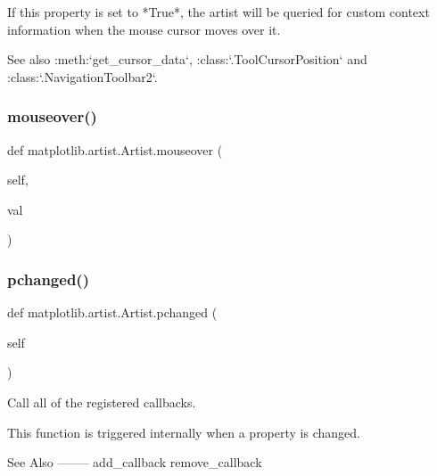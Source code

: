 \begin{DoxyVerb}If this property is set to *True*, the artist will be queried for
custom context information when the mouse cursor moves over it.

See also :meth:`get_cursor_data`, :class:`.ToolCursorPosition` and
:class:`.NavigationToolbar2`.
\end{DoxyVerb}
 \mbox{\label{classmatplotlib_1_1artist_1_1Artist_a72303987b50ca8e6dd2e15133882b6f6}} 
\subsubsection{\texorpdfstring{mouseover()}{mouseover()}\hspace{0.1cm}{\footnotesize\ttfamily [2/2]}}
{\footnotesize\ttfamily def matplotlib.\+artist.\+Artist.\+mouseover (\begin{DoxyParamCaption}\item[{}]{self,  }\item[{}]{val }\end{DoxyParamCaption})}

\mbox{\label{classmatplotlib_1_1artist_1_1Artist_a2a0afb32e4bb80f08e96099ccc92c00f}} 
\subsubsection{\texorpdfstring{pchanged()}{pchanged()}}
{\footnotesize\ttfamily def matplotlib.\+artist.\+Artist.\+pchanged (\begin{DoxyParamCaption}\item[{}]{self }\end{DoxyParamCaption})}

\begin{DoxyVerb}Call all of the registered callbacks.

This function is triggered internally when a property is changed.

See Also
--------
add_callback
remove_callback
\end{DoxyVerb}
 \mbox{\label{classmatplotlib_1_1artist_1_1Artist_a9f4fb435d6223d31c50aa5935a655dd3}} 

